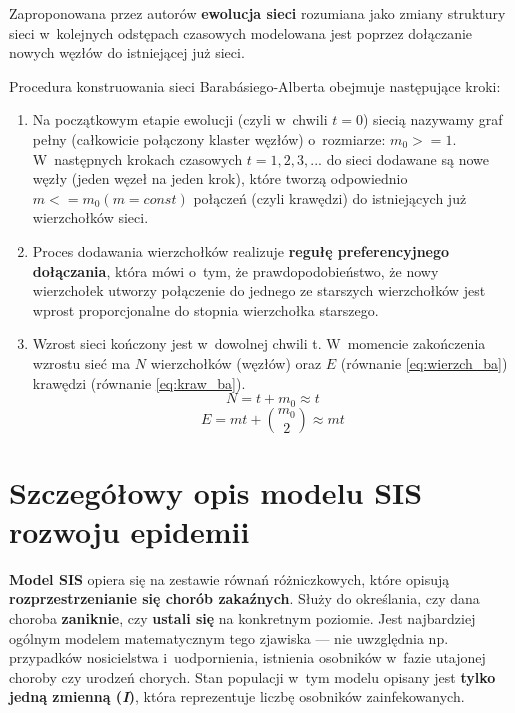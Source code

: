 Zaproponowana przez autorów \textbf{ewolucja sieci} rozumiana jako zmiany struktury sieci w~kolejnych odstępach czasowych modelowana jest poprzez dołączanie nowych węzłów do istniejącej już sieci. 

Procedura konstruowania sieci Barabásiego-Alberta obejmuje następujące kroki:

\begin{enumerate}
\item Na początkowym etapie ewolucji (czyli w~chwili $t = 0$) siecią nazywamy graf pełny (całkowicie połączony klaster węzłów) o~rozmiarze: $m_0 >= 1$. W~następnych krokach czasowych $t = 1,2,3,...$ do sieci dodawane są nowe węzły (jeden węzeł na jeden krok), które tworzą odpowiednio $m <= m_0  (m = const)$ połączeń (czyli krawędzi) do istniejących już wierzchołków sieci.
\item Proces dodawania wierzchołków realizuje \textbf{regułę preferencyjnego dołączania}, która mówi o~tym, że prawdopodobieństwo, że nowy wierzchołek utworzy połączenie do jednego ze starszych wierzchołków jest wprost proporcjonalne do stopnia wierzchołka starszego.
\item Wzrost sieci kończony jest w~dowolnej chwili t. W~momencie zakończenia wzrostu sieć ma $N$ wierzchołków (węzłów) oraz $E$ (równanie \ref{eq:wierzch_ba}) krawędzi (równanie \ref{eq:kraw_ba}).
\begin{equation}
\label{eq:wierzch_ba}
N = t + m_0 \approx t
\end{equation}
\begin{equation}
\label{eq:kraw_ba}
E = mt + \binom{m_0}{2} \approx mt
\end{equation}
\end{enumerate}


\section{Szczegółowy opis modelu SIS rozwoju epidemii}
\label{sec:szczegolowy_opis_modelu_sis_rozwoju_epidemii}

\textbf{Model SIS} opiera się na zestawie równań różniczkowych, które opisują \textbf{rozprzestrzenianie się chorób zakaźnych}. Służy do określania, czy dana choroba \textbf{zaniknie}, czy \textbf{ustali się} na konkretnym poziomie. Jest najbardziej ogólnym modelem matematycznym tego zjawiska --- nie uwzględnia np. przypadków nosicielstwa i~uodpornienia, istnienia osobników w~fazie utajonej choroby czy urodzeń chorych. Stan populacji w~tym modelu opisany jest \textbf{tylko jedną zmienną (\textit{I})}, która reprezentuje liczbę osobników zainfekowanych.

